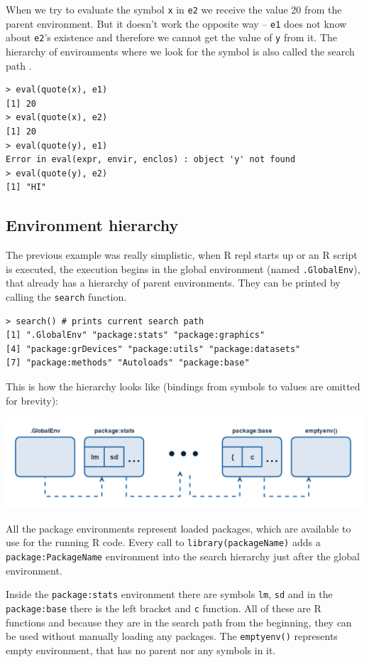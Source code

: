 \documentclass[thesis=B,english]{FITthesis}[2012/10/20]
\begin{document}
When we try to evaluate the symbol \verb|x| in \verb|e2| we receive the value 20 from the parent environment. But it doesn’t work the opposite way – \verb|e1| does not know about \verb|e2|’s existence and therefore we cannot get the value of \verb|y| from it. The hierarchy of environments where we look for the symbol is also called the search path \cite{specs}.

\begin{verbatim}
> eval(quote(x), e1)
[1] 20
> eval(quote(x), e2)
[1] 20
> eval(quote(y), e1)
Error in eval(expr, envir, enclos) : object 'y' not found
> eval(quote(y), e2)
[1] "HI"
\end{verbatim}

\subsection{Environment hierarchy}
The previous example was really simplistic, when R repl starts up or an R script is executed, the execution begins in the global environment (named \verb|.GlobalEnv|), that already has a hierarchy of parent environments. They can be printed by calling the \verb|search| function.

\begin{verbatim}
> search() # prints current search path
[1] ".GlobalEnv" "package:stats" "package:graphics"
[4] "package:grDevices" "package:utils" "package:datasets"
[7] "package:methods" "Autoloads" "package:base"
\end{verbatim}

This is how the hierarchy looks like (bindings from symbols to values are omitted for brevity):

\includegraphics[width=\textwidth]{img/search-path.png}

All the package environments represent loaded packages, which are available to use for the running R code. Every call to \verb|library(packageName)| adds a \verb|package:PackageName| environment into the search hierarchy just after the global environment.

Inside the \verb|package:stats| environment there are symbols \verb|lm|, \verb|sd| and in the \verb|package:base| there is the left bracket and \verb|c| function. All of these are R functions and because they are in the search path from the beginning, they can be used without manually loading any packages. The \verb|emptyenv()| represents empty environment, that has no parent nor any symbols in it.
\end{document}
